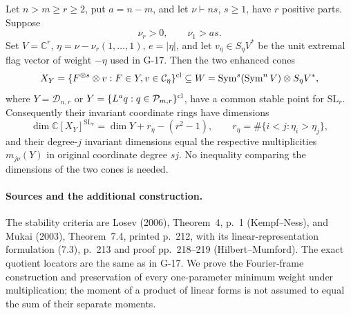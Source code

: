 \begin{proposition}\label{G-22}
Let $n>m\ge r\ge2$, put $a=n-m$, and let
$\nu\vdash ns$, $s\ge1$, have $r$ positive parts. Suppose
\[
 \nu_r>0,\qquad \nu_1>as.
\]
Set $V=\mathbb C^r$, $\eta=\nu-\nu_r(1,\ldots,1)$,
$e=|\eta|$, and let $v_\eta\in S_\eta V^*$ be the unit
extremal flag vector of weight $-\eta$ used in G-17.
Then the two enhanced cones
\[
 X_Y=\{F^{\otimes s}\otimes v:F\in Y,
                  v\in\mathcal C_\eta\}^{\rm cl}
 \subseteq W=\operatorname{Sym}^s(\operatorname{Sym}^nV)
                         \otimes S_\eta V^*,
\]
where $Y=\mathcal D_{n,r}$ or
$Y=\{L^a q:q\in\mathcal P_{m,r}\}^{\rm cl}$,
have a common stable point for $\mathrm{SL}_r$.
Consequently their invariant coordinate rings have dimensions
\[
 \dim\mathbb C[X_Y]^{\mathrm{SL}_r}
 =\dim Y+r_\eta-(r^2-1),\qquad
 r_\eta=\#\{i<j:\eta_i>\eta_j\},
\]
and their degree-$j$ invariant dimensions equal the respective
multiplicities $m_{j\nu}(Y)$ in original coordinate degree $sj$.
No inequality comparing the dimensions of the two cones is needed.
\end{proposition}

\paragraph{Sources and the additional construction.}
The stability criteria are Losev (2006), Theorem~4, p.~1
(Kempf--Ness), and Mukai (2003), Theorem~7.4, printed p.~212,
with its linear-representation formulation (7.3), p.~213
and proof pp.~218--219 (Hilbert--Mumford). The exact quotient
locators are the same as in G-17. We prove the Fourier-frame
construction and preservation of every one-parameter minimum
weight under multiplication; the moment of a product of linear
forms is not assumed to equal the sum of their separate moments.

